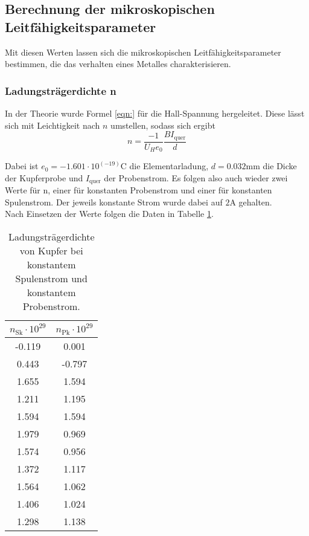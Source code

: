 \noindent 

\subsection{Berechnung der mikroskopischen Leitfähigkeitsparameter}

Mit diesen Werten lassen sich die mikroskopischen Leitfähigkeitsparameter bestimmen, die das verhalten eines Metalles charakterisieren.

\subsubsection{Ladungsträgerdichte n}
In der Theorie wurde Formel \eqref{eqn:} für die Hall-Spannung hergeleitet.
Diese lässt sich mit Leichtigkeit nach $n$ umstellen, sodass sich ergibt
\begin{equation}
n = \frac{-1}{U_H e_0} \frac{B I_\text{quer}}{d}
\end{equation}

Dabei ist $e_0 = -1.601 \cdot 10^(-19)\si{\coulomb}$ die Elementarladung, $d = 0.032 \si{\milli\meter}$ die Dicke der Kupferprobe
und $I_\text{quer}$ der Probenstrom.
Es folgen also auch wieder zwei Werte für n, einer für konstanten Probenstrom und einer für
konstanten Spulenstrom. Der jeweils konstante Strom wurde dabei auf $2 \si{\ampere}$ gehalten.\\
Nach Einsetzen der Werte folgen die Daten in Tabelle \ref{tab:nnn}.

\begin{table}
 \centering
 \label{tab:nnn}
 \caption{Ladungsträgerdichte von Kupfer bei konstantem Spulenstrom und konstantem Probenstrom.}
 \begin{tabular}{c c}
  \toprule
  $n_\text{Sk} \cdot 10^{29}$ & $n_\text{Pk} \cdot 10^{29}$ \\
  \midrule
   -0.119& 0.001\\
   0.443 & -0.797\\  
   1.655 & 1.594\\
   1.211 & 1.195\\
   1.594 & 1.594\\
   1.979 & 0.969\\
   1.574 & 0.956\\
   1.372 & 1.117\\       
   1.564 & 1.062\\
   1.406 & 1.024\\
   1.298 & 1.138\\   
  \bottomrule
 \end{tabular}
\end{table} 

